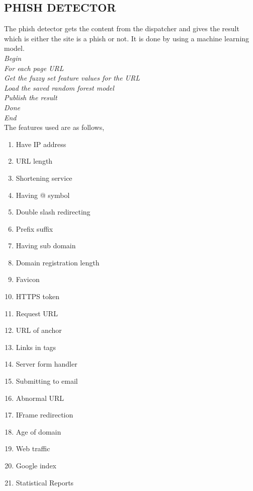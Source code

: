 \subsection{PHISH DETECTOR}
The phish detector gets the content from the dispatcher and gives the result which is either the site is a phish or not. It is done by using a machine learning model.\\
\null\quad\textit{Begin}\\
\null\quad\quad\textit{For each page URL}\\
\null\quad\quad\quad\textit{Get the fuzzy set feature values for the URL}\\
\null\quad\quad\quad\textit{Load the saved random forest model}\\
\null\quad\quad\quad\textit{Publish the result}\\
\null\quad\quad\textit{Done}\\
\null\quad\textit{End}\\

The features used are as follows,

\begin{enumerate}
  \item Have IP address
  \item URL length
  \item Shortening service
  \item Having @ symbol
  \item Double slash redirecting
  \item Prefix suffix
  \item Having sub domain
  \item Domain registration length
  \item Favicon
  \item HTTPS token
  \item Request URL
  \item URL of anchor
  \item Links in tags
  \item Server form handler
  \item Submitting to email
  \item Abnormal URL
  \item IFrame redirection
  \item Age of domain
  \item Web traffic
  \item Google index
  \item Statistical Reports
\end{enumerate}

